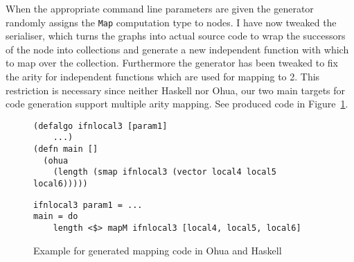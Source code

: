 When the appropriate command line parameters are given the generator randomly assigns the \texttt{Map} computation type to nodes.
I have now tweaked the serialiser, which turns the graphs into actual source code to wrap the successors of the node into collections and generate a new independent function with which to map over the collection.
Furthermore the generator has been tweaked to fix the arity for independent functions which are used for mapping to 2.
This restriction is necessary since neither Haskell nor Ohua, our two main targets for code generation support multiple arity mapping.
See produced code in Figure~\ref{fig:generated-map-code}.

\begin{figure}
\begin{verbatim}
(defalgo ifnlocal3 [param1]
    ...)
(defn main []
  (ohua
    (length (smap ifnlocal3 (vector local4 local5 local6)))))
\end{verbatim}
\begin{verbatim}
ifnlocal3 param1 = ...
main = do
    length <$> mapM ifnlocal3 [local4, local5, local6]
\end{verbatim}
\caption{Example for generated mapping code in Ohua and Haskell}
\label{fig:generated-map-code}
\end{figure}
